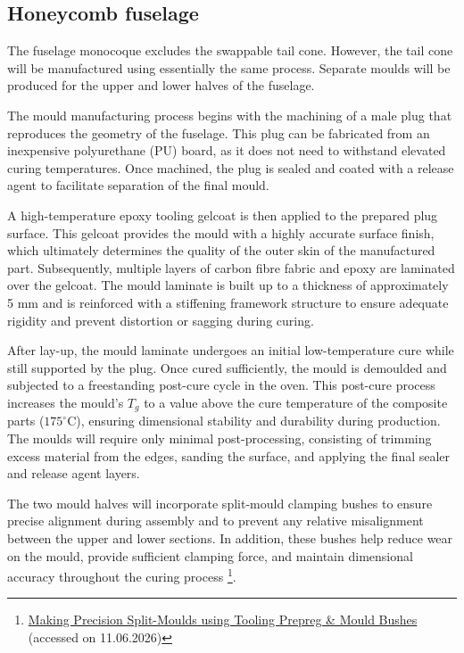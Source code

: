 \subsection{Honeycomb fuselage}

The fuselage monocoque excludes the swappable tail cone. However, the tail cone will be manufactured using essentially the same process. Separate moulds will be produced for the upper and lower halves of the fuselage.

The mould manufacturing process begins with the machining of a male plug that reproduces the geometry of the fuselage. This plug can be fabricated from an inexpensive polyurethane (PU) board, as it does not need to withstand elevated curing temperatures. Once machined, the plug is sealed and coated with a release agent to facilitate separation of the final mould.

A high-temperature epoxy tooling gelcoat is then applied to the prepared plug surface. This gelcoat provides the mould with a highly accurate surface finish, which ultimately determines the quality of the outer skin of the manufactured part. Subsequently, multiple layers of carbon fibre fabric and epoxy are laminated over the gelcoat. The mould laminate is built up to a thickness of approximately 5 mm and is reinforced with a stiffening framework structure to ensure adequate rigidity and prevent distortion or sagging during curing.

After lay-up, the mould laminate undergoes an initial low-temperature cure while still supported by the plug. Once cured sufficiently, the mould is demoulded and subjected to a freestanding post-cure cycle in the oven. This post-cure process increases the mould's $T_g$ to a value above the cure temperature of the composite parts ($175^\circ$C), ensuring dimensional stability and durability during production. The moulds will require only minimal post-processing, consisting of trimming excess material from the edges, sanding the surface, and applying the final sealer and release agent layers.

The two mould halves will incorporate split-mould clamping bushes to ensure precise alignment during assembly and to prevent any relative misalignment between the upper and lower sections. In addition, these bushes help reduce wear on the mould, provide sufficient clamping force, and maintain dimensional accuracy throughout the curing process \footnote{\href{https://www.easycomposites.co.uk/learning/precision-split-moulds-using-tooling-prepreg}{Making Precision Split-Moulds using Tooling Prepreg \& Mould Bushes} (accessed on 11.06.2026)}.

